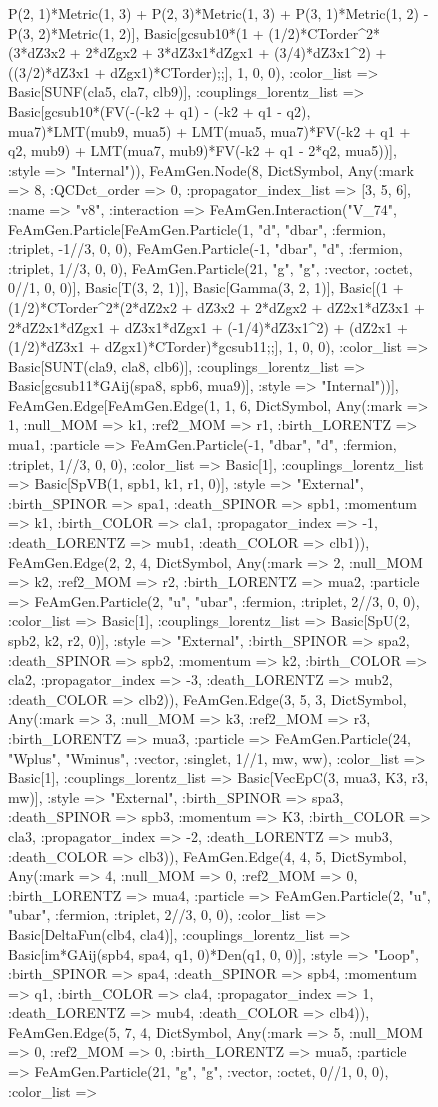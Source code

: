 \documentclass{revtex4}
\begin{document}
\begin{figure}[!htb]
\begin{center}
{P(2, 1)*Metric(1, 3) + P(2, 3)*Metric(1, 3) + P(3, 1)*Metric(1, 2) - P(3, 2)*Metric(1, 2)], Basic[gcsub10*(1 + (1/2)*CTorder^2*(3*dZ3x2 + 2*dZgx2 + 3*dZ3x1*dZgx1 + (3/4)*dZ3x1^2) + ((3/2)*dZ3x1 + dZgx1)*CTorder);;], 1, 0, 0), :color_list => Basic[SUNF(cla5, cla7, clb9)], :couplings_lorentz_list => Basic[gcsub10*(FV(-(-k2 + q1) - (-k2 + q1 - q2), mua7)*LMT(mub9, mua5) + LMT(mua5, mua7)*FV(-k2 + q1 + q2, mub9) + LMT(mua7, mub9)*FV(-k2 + q1 - 2*q2, mua5))], :style => "Internal")), FeAmGen.Node(8, Dict{Symbol, Any}(:mark => 8, :QCDct_order => 0, :propagator_index_list => [3, 5, 6], :name => "v8", :interaction => FeAmGen.Interaction("V_74", FeAmGen.Particle[FeAmGen.Particle(1, "d", "dbar", :fermion, :triplet, -1//3, 0, 0), FeAmGen.Particle(-1, "dbar", "d", :fermion, :triplet, 1//3, 0, 0), FeAmGen.Particle(21, "g", "g", :vector, :octet, 0//1, 0, 0)], Basic[T(3, 2, 1)], Basic[Gamma(3, 2, 1)], Basic[(1 + (1/2)*CTorder^2*(2*dZ2x2 + dZ3x2 + 2*dZgx2 + dZ2x1*dZ3x1 + 2*dZ2x1*dZgx1 + dZ3x1*dZgx1 + (-1/4)*dZ3x1^2) + (dZ2x1 + (1/2)*dZ3x1 + dZgx1)*CTorder)*gcsub11;;], 1, 0, 0), :color_list => Basic[SUNT(cla9, cla8, clb6)], :couplings_lorentz_list => Basic[gcsub11*GAij(spa8, spb6, mua9)], :style => "Internal"))], FeAmGen.Edge[FeAmGen.Edge(1, 1, 6, Dict{Symbol, Any}(:mark => 1, :null_MOM => k1, :ref2_MOM => r1, :birth_LORENTZ => mua1, :particle => FeAmGen.Particle(-1, "dbar", "d", :fermion, :triplet, 1//3, 0, 0), :color_list => Basic[1], :couplings_lorentz_list => Basic[SpVB(1, spb1, k1, r1, 0)], :style => "External", :birth_SPINOR => spa1, :death_SPINOR => spb1, :momentum => k1, :birth_COLOR => cla1, :propagator_index => -1, :death_LORENTZ => mub1, :death_COLOR => clb1)), FeAmGen.Edge(2, 2, 4, Dict{Symbol, Any}(:mark => 2, :null_MOM => k2, :ref2_MOM => r2, :birth_LORENTZ => mua2, :particle => FeAmGen.Particle(2, "u", "ubar", :fermion, :triplet, 2//3, 0, 0), :color_list => Basic[1], :couplings_lorentz_list => Basic[SpU(2, spb2, k2, r2, 0)], :style => "External", :birth_SPINOR => spa2, :death_SPINOR => spb2, :momentum => k2, :birth_COLOR => cla2, :propagator_index => -3, :death_LORENTZ => mub2, :death_COLOR => clb2)), FeAmGen.Edge(3, 5, 3, Dict{Symbol, Any}(:mark => 3, :null_MOM => k3, :ref2_MOM => r3, :birth_LORENTZ => mua3, :particle => FeAmGen.Particle(24, "Wplus", "Wminus", :vector, :singlet, 1//1, mw, ww), :color_list => Basic[1], :couplings_lorentz_list => Basic[VecEpC(3, mua3, K3, r3, mw)], :style => "External", :birth_SPINOR => spa3, :death_SPINOR => spb3, :momentum => K3, :birth_COLOR => cla3, :propagator_index => -2, :death_LORENTZ => mub3, :death_COLOR => clb3)), FeAmGen.Edge(4, 4, 5, Dict{Symbol, Any}(:mark => 4, :null_MOM => 0, :ref2_MOM => 0, :birth_LORENTZ => mua4, :particle => FeAmGen.Particle(2, "u", "ubar", :fermion, :triplet, 2//3, 0, 0), :color_list => Basic[DeltaFun(clb4, cla4)], :couplings_lorentz_list => Basic[im*GAij(spb4, spa4, q1, 0)*Den(q1, 0, 0)], :style => "Loop", :birth_SPINOR => spa4, :death_SPINOR => spb4, :momentum => q1, :birth_COLOR => cla4, :propagator_index => 1, :death_LORENTZ => mub4, :death_COLOR => clb4)), FeAmGen.Edge(5, 7, 4, Dict{Symbol, Any}(:mark => 5, :null_MOM => 0, :ref2_MOM => 0, :birth_LORENTZ => mua5, :particle => FeAmGen.Particle(21, "g", "g", :vector, :octet, 0//1, 0, 0), :color_list => }
\end{center}
\end{figure}
\end{document}
